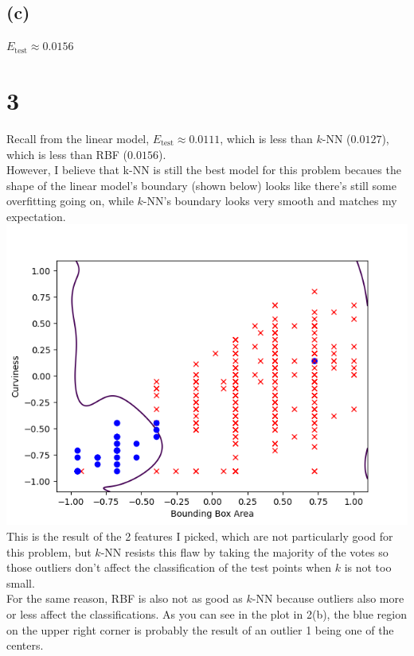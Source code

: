 \documentclass{article}
\begin{document}
	\subsection*{(c)}
		$E_\text{test} \approx 0.0156$
		
	\section*{3}
		Recall from the linear model, $E_\text{test} \approx 0.0111$, which is less than $k$-NN ($0.0127$), which is less than RBF ($0.0156$).\\
		However, I believe that k-NN is still the best model for this problem becaues the shape of the linear model's boundary (shown below) looks like there's still some overfitting going on, while $k$-NN's boundary looks very smooth and matches my expectation.\\
		\includegraphics[scale=0.8]{../hw09/3.png}\\
		This is the result of the 2 features I picked, which are not particularly good for this problem, but $k$-NN resists this flaw by taking the majority of the votes so those outliers don't affect the classification of the test points when $k$ is not too small.\\
		For the same reason, RBF is also not as good as $k$-NN because outliers also more or less affect the classifications. As you can see in the plot in 2(b), the blue region on the upper right corner is probably the result of an outlier 1 being one of the centers.
		
\end{document}

